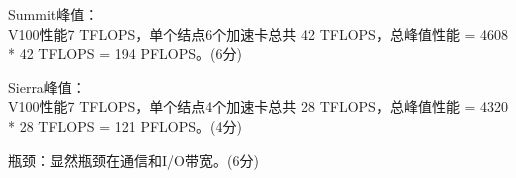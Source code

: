 \documentclass[a4paper, 12pt, answers]{exam}
\begin{document}
\begin{questions}
\begin{solution}[10cm]

	Summit峰值： \\
	V100性能7 TFLOPS，单个结点6个加速卡总共 42 TFLOPS，总峰值性能 = 4608 * 42 TFLOPS = 194 PFLOPS。(6分)

	Sierra峰值： \\
	V100性能7 TFLOPS，单个结点4个加速卡总共 28 TFLOPS，总峰值性能 = 4320 * 28 TFLOPS = 121 PFLOPS。(4分)

	瓶颈：显然瓶颈在通信和I/O带宽。(6分)



\end{solution}



\end{questions}
\end{document}
